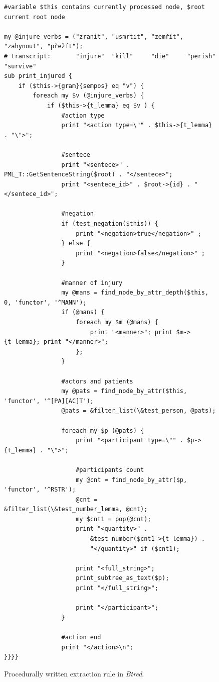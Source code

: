 \begin{figure}
\begin{verbatim}
#variable $this contains currently processed node, $root current root node

my @injure_verbs = ("zranit", "usmrtit", "zemřít", "zahynout", "přežít");
# transcript:       "injure"  "kill"     "die"     "perish"    "survive"
sub print_injured {
	if ($this->{gram}{sempos} eq "v") {
		foreach my $v (@injure_verbs) {
			if ($this->{t_lemma} eq $v ) {
				#action type
				print "<action type=\"" . $this->{t_lemma} . "\">";

				#sentece
				print "<sentece>" . PML_T::GetSentenceString($root) . "</sentece>";
				print "<sentece_id>" . $root->{id} . "</sentece_id>";
				
				#negation
				if (test_negation($this)) {
					print "<negation>true</negation>" ;					
				} else {
					print "<negation>false</negation>" ;										
				}
								
				#manner of injury
				my @mans = find_node_by_attr_depth($this, 0, 'functor', '^MANN');
				if (@mans) {
					foreach my $m (@mans) {
						print "<manner>"; print $m->{t_lemma}; print "</manner>"; 
					};
				}
				
				#actors and patients
				my @pats = find_node_by_attr($this, 'functor', '^[PA][AC]T');
				@pats = &filter_list(\&test_person, @pats);
				
				foreach my $p (@pats) {
					print "<participant type=\"" . $p->{t_lemma} . "\">";

					#participants count
					my @cnt = find_node_by_attr($p, 'functor', '^RSTR');
					@cnt = &filter_list(\&test_number_lemma, @cnt);
					my $cnt1 = pop(@cnt);
					print "<quantity>" . 
						&test_number($cnt1->{t_lemma}) . 
						"</quantity>" if ($cnt1);
	
					print "<full_string>";
					print_subtree_as_text($p);
					print "</full_string>";

					print "</participant>";
				}
				
				#action end
				print "</action>\n";											
}}}}
\end{verbatim} 

\caption{Procedurally written extraction rule in \emph{Btred}.}
\label{fig:btred_rule}
\end{figure}




